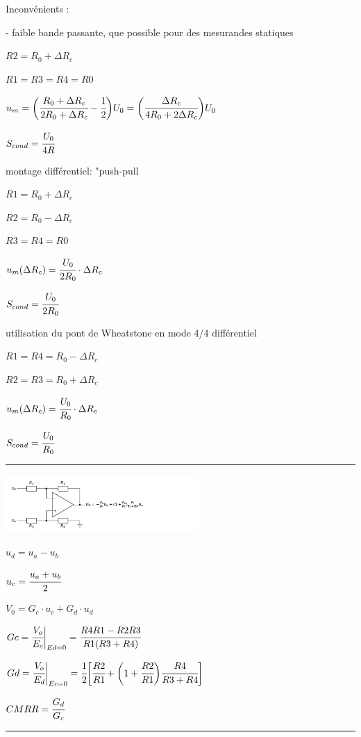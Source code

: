 \documentclass[	DIV=calc,%
							paper=a4,%
							fontsize=11pt,%
							twocolumn]{scrartcl} %
\newcommand{\hformbar}[1]{\bigskip\hrule\vspace{5pt}} %
\newcounter{mycounter}
\newcommand{\formdesc}[1]{\noindent\textbf{#1} \addtocounter{mycounter}{1} \hfill \themycounter}
\begin{document}
Inconvénients :

- faible bande passante, que possible pour des mesurandes statiques

$R2 = R_0 + \Delta R_c$

$R1 = R3 = R4 = R0$

$u_m = \bigg(\cfrac{R_0 + \Delta R_c}{2 R_0 + \Delta R_c}-\cfrac{1}{2}\bigg) U_0 = \bigg(\cfrac{\Delta R_c}{4 R_0 + 2\Delta R_c}\bigg) U_0$

$S_{cond} = \cfrac{U_0}{4R}$


montage différentiel: "push-pull

$R1 = R_0 + \Delta R_c$

$R2 = R_0 - \Delta R_c$

$R3 = R4 = R0$

$u_m(\Delta R_c) = \cfrac{U_0}{2R_0}\cdot \Delta R_c $

$S_{cond} = \cfrac{U_0}{2R_0}$

utilisation du pont de Wheatstone en mode 4/4 différentiel

$R1 = R4 = R_0 - \Delta R_c$

$R2 = R3 = R_0 + \Delta R_c$

$u_m(\Delta R_c) = \cfrac{U_0}{R_0}\cdot \Delta R_c $

$S_{cond} = \cfrac{U_0}{R_0}$


\hformbar

\formdesc{Amplificateur différentiel}

\includegraphics[width = 0.55\textwidth,center,trim={0 0 5cm 0},clip]{img/Ampli.pdf}

$u_d = u_a - u_b$

$u_c = \cfrac{u_a + u_b}{2}$

$V_0 = G_c \cdot u_c + G_d \cdot u_d $

$Gc = \cfrac{V_o}{E_c}\bigg|_{Ed = 0} = \cfrac{R4R1-R2R3}{R1(R3+R4)}$


$Gd = \cfrac{V_o}{E_d}\bigg|_{Ec = 0} = \cfrac{1}{2}\bigg[\cfrac{R2}{R1}+\bigg(1+ \cfrac{R2}{R1}\bigg)\cfrac{R4}{R3+R4}\bigg]$

$CMRR = \cfrac{G_d}{G_c}$



\hformbar

\formdesc{électromagnétisme}
\end{document}
